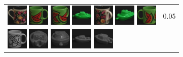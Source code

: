 \begin{figure}[tbp]
\begin{center}
\begin{tabular}{m{11cm} | m{3cm} |}
\includegraphics[width=1cm]{coil/beeld-61.eps}
\includegraphics[width=1cm]{coil/beeld-30.eps}
\includegraphics[width=1cm]{coil/beeld-33.eps}
\includegraphics[width=1cm]{coil/beeld-54.eps}
\includegraphics[width=1cm]{coil/beeld-64.eps}
\includegraphics[width=1cm]{coil/beeld-57.eps}
\includegraphics[width=1cm]{coil/beeld-31.eps}
& {\scriptsize 0.05}
\\
\includegraphics[width=1cm]{coil/beeld-48.eps}
\includegraphics[width=1cm]{coil/beeld-26.eps}
\includegraphics[width=1cm]{coil/beeld-28.eps}
\includegraphics[width=1cm]{coil/beeld-24.eps}
\includegraphics[width=1cm]{coil/beeld-25.eps}

\end{tabular}
\end{center}
\end{figure}
